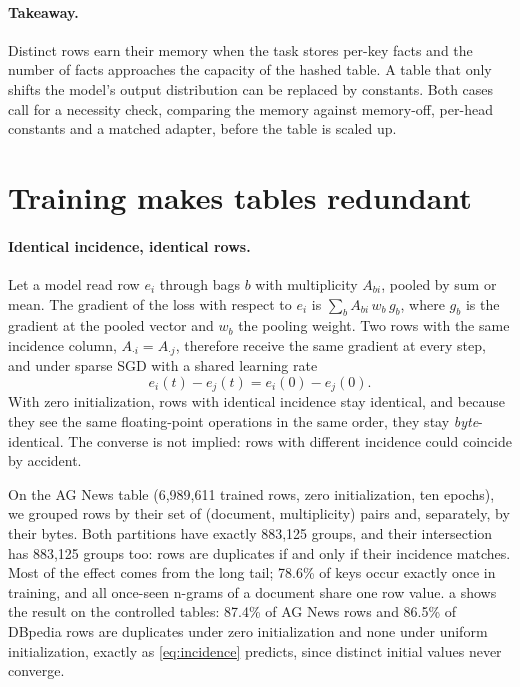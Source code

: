 \documentclass[10pt]{article}
\begin{document}
\paragraph{Takeaway.} Distinct rows earn their memory when the task stores per-key facts and the number of facts approaches the capacity of the hashed table. A table that only shifts the model's output distribution can be replaced by constants. Both cases call for a necessity check, comparing the memory against memory-off, per-head constants and a matched adapter, before the table is scaled up.

\section{Training makes tables redundant}
\label{sec:redundancy}

\paragraph{Identical incidence, identical rows.} Let a model read row $e_i$ through bags $b$ with multiplicity $A_{bi}$, pooled by sum or mean. The gradient of the loss with respect to $e_i$ is $\sum_b A_{bi}\, w_b\, g_b$, where $g_b$ is the gradient at the pooled vector and $w_b$ the pooling weight. Two rows with the same incidence column, $A_{\cdot i} = A_{\cdot j}$, therefore receive the same gradient at every step, and under sparse SGD with a shared learning rate
\begin{equation}
e_i(t) - e_j(t) = e_i(0) - e_j(0).
\label{eq:incidence}
\end{equation}
With zero initialization, rows with identical incidence stay identical, and because they see the same floating-point operations in the same order, they stay \emph{byte}-identical. The converse is not implied: rows with different incidence could coincide by accident.

On the AG News table (6,989,611 trained rows, zero initialization, ten epochs), we grouped rows by their set of (document, multiplicity) pairs and, separately, by their bytes. Both partitions have exactly 883,125 groups, and their intersection has 883,125 groups too: rows are duplicates if and only if their incidence matches. Most of the effect comes from the long tail; 78.6\% of keys occur exactly once in training, and all once-seen n-grams of a document share one row value. a shows the result on the controlled tables: 87.4\% of AG News rows and 86.5\% of DBpedia rows are duplicates under zero initialization and none under uniform initialization, exactly as \cref{eq:incidence} predicts, since distinct initial values never converge.
\end{document}
